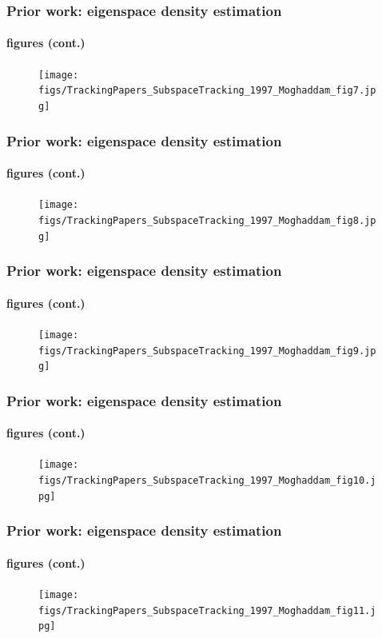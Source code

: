 \begin{frame}
\frametitle{Prior work: eigenspace density estimation}
\framesubtitle{figures (cont.)}
\mypagenum
	\begin{figure}
		\texttt{[image: figs/TrackingPapers\_SubspaceTracking\_1997\_Moghaddam\_fig7.jpg]}
	\end{figure}
\end{frame}




\begin{frame}
\frametitle{Prior work: eigenspace density estimation}
\framesubtitle{figures (cont.)}
\mypagenum
	\begin{figure}
		\texttt{[image: figs/TrackingPapers\_SubspaceTracking\_1997\_Moghaddam\_fig8.jpg]}
	\end{figure}
\end{frame}



\begin{frame}
\frametitle{Prior work: eigenspace density estimation}
\framesubtitle{figures (cont.)}
\mypagenum
	\begin{figure}
		\texttt{[image: figs/TrackingPapers\_SubspaceTracking\_1997\_Moghaddam\_fig9.jpg]}
	\end{figure}
\end{frame}



\begin{frame}
\frametitle{Prior work: eigenspace density estimation}
\framesubtitle{figures (cont.)}
\mypagenum
	\begin{figure}
		\texttt{[image: figs/TrackingPapers\_SubspaceTracking\_1997\_Moghaddam\_fig10.jpg]}
	\end{figure}
\end{frame}



\begin{frame}
\frametitle{Prior work: eigenspace density estimation}
\framesubtitle{figures (cont.)}
\mypagenum
	\begin{figure}
		\texttt{[image: figs/TrackingPapers\_SubspaceTracking\_1997\_Moghaddam\_fig11.jpg]}
	\end{figure}
\end{frame}



